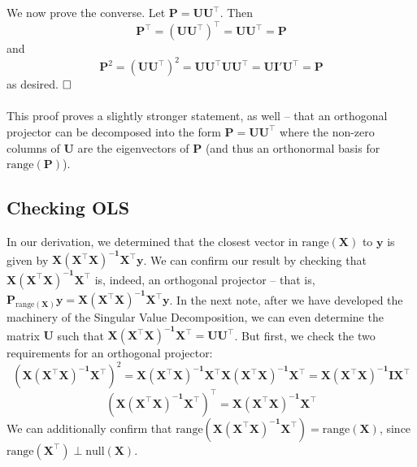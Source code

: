 \documentclass{article}
\begin{document}
We now prove the converse. Let $\mathbf{P} = \mathbf{UU^{\top}}$. Then $$\mathbf{P}^{\top} = (\mathbf{UU^{\top}})^{\top} = \mathbf{UU^{\top}} = \mathbf{P}$$ and $$\mathbf{P}^2 = (\mathbf{UU^{\top}})^2 = \mathbf{UU^{\top}UU^{\top}} = \mathbf{UI'U^{\top}} = \mathbf{P}$$ as desired. $\hfill\square$\\\\
This proof proves a slightly stronger statement, as well -- that an orthogonal projector can be decomposed into the form $\mathbf{P} = \mathbf{UU}^{\top}$ where the non-zero columns of $\mathbf{U}$ are the eigenvectors of $\mathbf{P}$ (and thus an orthonormal basis for $\text{range}(\mathbf{P})$).


\subsection{Checking OLS}
In our derivation, we determined that the closest vector in $\text{range}(\mathbf{X})$ to $\mathbf{y}$ is given by $\mathbf{X(X^{\top}X)^{-1}X^{\top}y}$. We can confirm our result by checking that $\mathbf{X(X^{\top}X)^{-1}X^{\top}}$ is, indeed, an orthogonal projector -- that is, $\mathbf{P}_{\text{range}(\mathbf{X})}\mathbf{y} = \mathbf{X(X^{\top}X)^{-1}X^{\top}y}$. In the next note, after we have developed the machinery of the Singular Value Decomposition, we can even determine the matrix $\mathbf{U}$ such that $\mathbf{X(X^{\top}X)^{-1}X^{\top}} = \mathbf{UU^{\top}}$. But first, we check the two requirements for an orthogonal projector: $$(\mathbf{X(X^{\top}X)^{-1}X^{\top}})^2 = \mathbf{X(X^{\top}X)^{-1}X^{\top}X(X^{\top}X)^{-1}X^{\top}} = \mathbf{X(X^{\top}X)^{-1}IX^{\top}}$$ $$(\mathbf{X(X^{\top}X)^{-1}X^{\top}})^{\top} = \mathbf{X(X^{\top}X)^{-1}X^{\top}}$$ We can additionally confirm that $\text{range}(\mathbf{X(X^{\top}X)^{-1}X^{\top}}) = \text{range}(\mathbf{X})$, since $\text{range}(\mathbf{X^{\top}}) \perp \text{null}(\mathbf{X})$.
\clearpage
\end{document}
